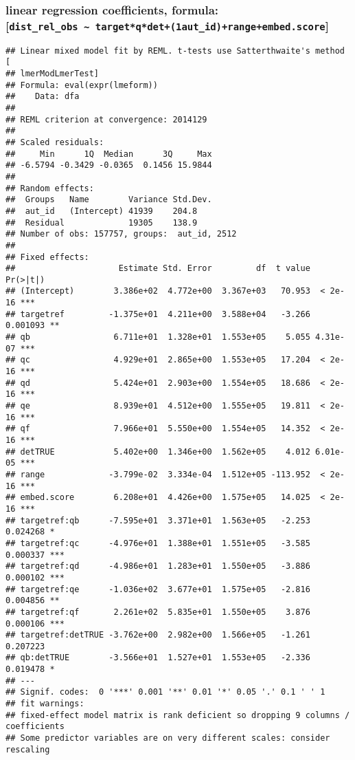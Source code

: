 \documentclass[
]{article}
\begin{document}
\subsubsection{\texorpdfstring{linear regression coefficients, formula: {[}\texttt{dist\_rel\_obs\ \textasciitilde{}\ target*q*det+(1\textbar{}aut\_id)+range+embed.score}{]}}{linear regression coefficients, formula: {[}dist\_rel\_obs \textasciitilde{} target*q*det+(1\textbar aut\_id)+range+embed.score{]}}}\label{linear-regression-coefficients-formula-dist_rel_obs-targetqdet1aut_idrangeembed.score}

\begin{verbatim}
## Linear mixed model fit by REML. t-tests use Satterthwaite's method [
## lmerModLmerTest]
## Formula: eval(expr(lmeform))
##    Data: dfa
## 
## REML criterion at convergence: 2014129
## 
## Scaled residuals: 
##     Min      1Q  Median      3Q     Max 
## -6.5794 -0.3429 -0.0365  0.1456 15.9844 
## 
## Random effects:
##  Groups   Name        Variance Std.Dev.
##  aut_id   (Intercept) 41939    204.8   
##  Residual             19305    138.9   
## Number of obs: 157757, groups:  aut_id, 2512
## 
## Fixed effects:
##                     Estimate Std. Error         df  t value Pr(>|t|)    
## (Intercept)        3.386e+02  4.772e+00  3.367e+03   70.953  < 2e-16 ***
## targetref         -1.375e+01  4.211e+00  3.588e+04   -3.266 0.001093 ** 
## qb                 6.711e+01  1.328e+01  1.553e+05    5.055 4.31e-07 ***
## qc                 4.929e+01  2.865e+00  1.553e+05   17.204  < 2e-16 ***
## qd                 5.424e+01  2.903e+00  1.554e+05   18.686  < 2e-16 ***
## qe                 8.939e+01  4.512e+00  1.555e+05   19.811  < 2e-16 ***
## qf                 7.966e+01  5.550e+00  1.554e+05   14.352  < 2e-16 ***
## detTRUE            5.402e+00  1.346e+00  1.562e+05    4.012 6.01e-05 ***
## range             -3.799e-02  3.334e-04  1.512e+05 -113.952  < 2e-16 ***
## embed.score        6.208e+01  4.426e+00  1.575e+05   14.025  < 2e-16 ***
## targetref:qb      -7.595e+01  3.371e+01  1.563e+05   -2.253 0.024268 *  
## targetref:qc      -4.976e+01  1.388e+01  1.551e+05   -3.585 0.000337 ***
## targetref:qd      -4.986e+01  1.283e+01  1.550e+05   -3.886 0.000102 ***
## targetref:qe      -1.036e+02  3.677e+01  1.575e+05   -2.816 0.004856 ** 
## targetref:qf       2.261e+02  5.835e+01  1.550e+05    3.876 0.000106 ***
## targetref:detTRUE -3.762e+00  2.982e+00  1.566e+05   -1.261 0.207223    
## qb:detTRUE        -3.566e+01  1.527e+01  1.553e+05   -2.336 0.019478 *  
## ---
## Signif. codes:  0 '***' 0.001 '**' 0.01 '*' 0.05 '.' 0.1 ' ' 1
## fit warnings:
## fixed-effect model matrix is rank deficient so dropping 9 columns / coefficients
## Some predictor variables are on very different scales: consider rescaling
\end{verbatim}
\end{document}
